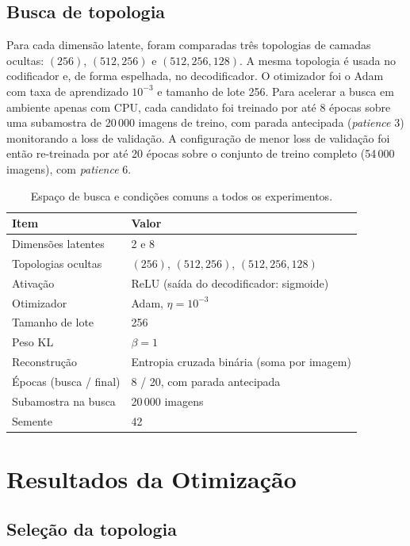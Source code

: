 \documentclass[11pt,a4paper]{article}
\begin{document}
\subsection{Busca de topologia}

Para cada dimensão latente, foram comparadas três topologias de camadas
ocultas: $(256)$, $(512,256)$ e $(512,256,128)$. A mesma topologia é usada no
codificador e, de forma espelhada, no decodificador. O otimizador foi o Adam
com taxa de aprendizado $10^{-3}$ e tamanho de lote 256. Para acelerar a busca
em ambiente apenas com CPU, cada candidato foi treinado por até 8 épocas sobre
uma subamostra de 20\,000 imagens de treino, com parada antecipada
(\textit{patience} 3) monitorando a loss de validação. A configuração de menor
loss de validação foi então re-treinada por até 20 épocas sobre o conjunto de
treino completo (54\,000 imagens), com \textit{patience} 6.

\begin{table}[H]
\centering
\small
\caption{Espaço de busca e condições comuns a todos os experimentos.}
\label{tab:setup}
\begin{tabularx}{\textwidth}{lX}
\toprule
\textbf{Item} & \textbf{Valor} \\
\midrule
Dimensões latentes & 2 e 8 \\
Topologias ocultas & $(256)$, $(512,256)$, $(512,256,128)$ \\
Ativação & ReLU (saída do decodificador: sigmoide) \\
Otimizador & Adam, $\eta=10^{-3}$ \\
Tamanho de lote & 256 \\
Peso KL & $\beta = 1$ \\
Reconstrução & Entropia cruzada binária (soma por imagem) \\
Épocas (busca / final) & 8 / 20, com parada antecipada \\
Subamostra na busca & 20\,000 imagens \\
Semente & 42 \\
\bottomrule
\end{tabularx}
\end{table}

\section{Resultados da Otimização}

\subsection{Seleção da topologia}
\end{document}
